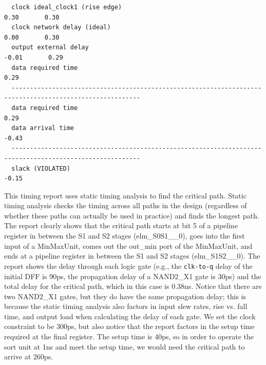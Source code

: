 \documentclass[a4paper,12pt,twoside]{article}
\begin{document}
\begin{verbatim}
  clock ideal_clock1 (rise edge)                                    0.30       0.30
  clock network delay (ideal)                                       0.00       0.30
  output external delay                                            -0.01       0.29
  data required time                                                           0.29
  ---------------------------------------------------------------------------------------------------------
  data required time                                                           0.29
  data arrival time                                                           -0.43
  ---------------------------------------------------------------------------------------------------------
  slack (VIOLATED)                                                            -0.15
\end{verbatim}
This timing report uses static timing analysis to find the critical path. Static timing analysis checks the timing across all paths in the design (regardless of whether these paths can actually be used in practice) and finds the longest path. The report clearly shows that the critical path starts at bit 5 of a pipeline register in between the S1 and S2 stages (elm\_S0S1\_\_0), goes into the first input of a MinMaxUnit, comes out the out\_min port of the MinMaxUnit, and ends at a pipeline register in between the S1 and S2 stages (elm\_S1S2\_\_0). The report shows the delay through each logic gate (e.g., the \texttt{clk-to-q} delay of the initial DFF is 90ps, the propagation delay of a NAND2\_X1 gate is 30ps) and the total delay for the critical path, which in this case is 0.38ns. Notice that there are two NAND2\_X1 gates, but they do have the same propagation delay; this is because the static timing analysis also factors in input slew rates, rise vs. fall time, and output load when calculating the delay of each gate. We set the clock constraint to be 300ps, but also notice that the report factors in the setup time required at the final register. The setup time is 40ps, so in order to operate the sort unit at 1ns and meet the setup time, we would need the critical path to arrive at 260ps.
\end{document}
